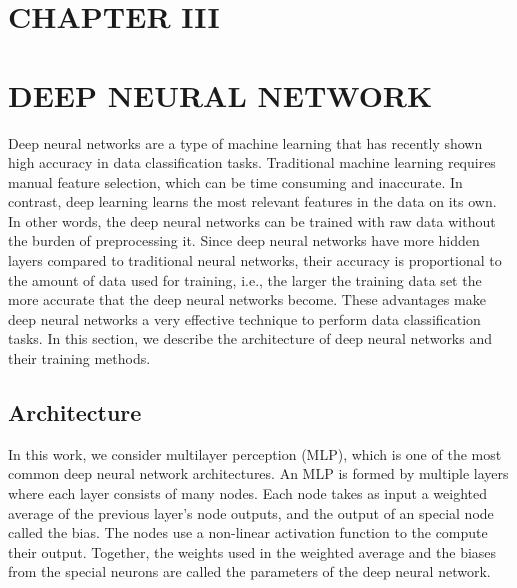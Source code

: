 \documentclass[letterpaper]{article}
\begin{document}
\begin{flushleft}
{\pagebreak
\section*{CHAPTER III}
\vspace{0.25in}
\section{DEEP NEURAL NETWORK}
Deep neural networks are a type of machine learning that has recently shown high accuracy in data classification tasks. Traditional
machine learning requires manual feature selection, which can be time consuming and inaccurate. In contrast, deep learning
learns the most relevant features in the data on its own. In other words, the deep neural networks can be trained with raw data without
the burden of preprocessing it. Since deep neural networks have more hidden layers compared to traditional neural networks, their
accuracy is proportional to the amount of data used for training, i.e., the larger the training data set the more accurate that the
deep neural networks become. These advantages make deep neural networks a very effective technique to perform data classification
tasks. In this section, we describe the architecture of deep neural networks and their training methods. 



\subsection{Architecture}\label{sec:MLP}

In this work, we consider multilayer perception (MLP), which is one of the most common deep neural network architectures. An
MLP is formed by multiple layers where each layer consists of many nodes. Each node takes 
as input a weighted average of the previous layer's node outputs, and the output of an special node called the bias.  
The nodes use a non-linear activation function to the compute their output. Together, the weights used in the weighted average and
the biases from the special neurons are called the parameters of the deep neural network.


}
\end{flushleft}
\end{document}
